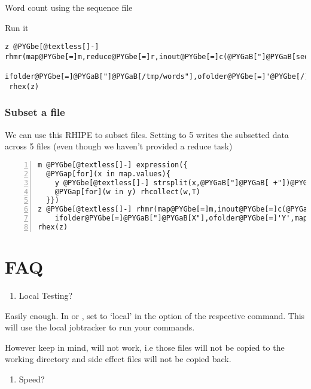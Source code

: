 \documentclass[letterpaper,10pt,english]{manual}
\begin{document}
Word count using the sequence file

Run it

\begin{Verbatim}[commandchars=@\[\]]
z @PYGbe[@textless[]-] rhmr(map@PYGbe[=]m,reduce@PYGbe[=]r,inout@PYGbe[=]c(@PYGaB["]@PYGaB[sequence"],@PYGaB["]@PYGaB[sequence"]),
       ifolder@PYGbe[=]@PYGaB["]@PYGaB[/tmp/words"],ofolder@PYGbe[=]'@PYGbe[/]tmp@PYGbe[/]wordcount')
 rhex(z)
\end{Verbatim}


\subsection{Subset a file}

We can use this RHIPE to subset files. Setting  to 5 writes the subsetted data across 5 files (even though we haven't provided a reduce task)

\begin{Verbatim}[commandchars=@\[\],numbers=left,firstnumber=1,stepnumber=1]
m @PYGbe[@textless[]-] expression({
  @PYGap[for](x in map.values){
    y @PYGbe[@textless[]-] strsplit(x,@PYGaB["]@PYGaB[ +"])@PYGZlb[]@PYGZlb[]@PYGaS[1]@PYGZrb[]@PYGZrb[]
    @PYGap[for](w in y) rhcollect(w,T)
  }})
z @PYGbe[@textless[]-] rhmr(map@PYGbe[=]m,inout@PYGbe[=]c(@PYGaB["]@PYGaB[text"],@PYGaB["]@PYGaB[binary"]),
    ifolder@PYGbe[=]@PYGaB["]@PYGaB[X"],ofolder@PYGbe[=]'Y',mapred@PYGbe[=]list(mapred.reduce.tasks@PYGbe[=]@PYGaS[5]))
rhex(z)
\end{Verbatim}

\resetcurrentobjects
\hypertarget{--doc-FAQ}{}

\chapter{FAQ}
\begin{enumerate}
\item {} 
Local Testing?

\end{enumerate}

Easily enough. In  or , set  to
`local' in the  option of the respective command. This will
use the local jobtracker to run your commands.

However keep in mind,
 will not work, i.e those files will not be copied to the
working directory and side effect files will not be copied back.
\begin{enumerate}
\item {} 
Speed?

\end{enumerate}
\end{document}

